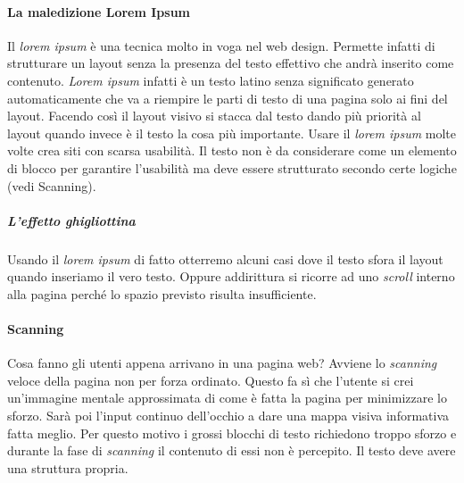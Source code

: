 			\paragraph{La maledizione Lorem Ipsum}
				Il \emph{lorem ipsum} è una tecnica molto in voga nel web design. Permette infatti di strutturare un layout senza la presenza del testo effettivo che andrà inserito come contenuto. \emph{Lorem ipsum} infatti è un testo latino senza significato generato automaticamente che va a riempire le parti di testo di una pagina solo ai fini del layout.
				Facendo così il layout visivo si stacca dal testo dando più priorità al layout quando invece è il testo la cosa più importante. Usare il \emph{lorem ipsum} molte volte crea siti con scarsa usabilità.
				Il testo non è da considerare come un elemento di blocco per garantire l'usabilità ma deve essere strutturato secondo certe logiche (vedi Scanning).
				
				\subparagraph{L'effetto ghigliottina}
					Usando il \emph{lorem ipsum} di fatto otterremo alcuni casi dove il testo sfora il layout quando inseriamo il vero testo. Oppure addirittura si ricorre ad uno \emph{scroll} interno alla pagina perché lo spazio previsto risulta insufficiente. 
				
			\paragraph{Scanning}
				Cosa fanno gli utenti appena arrivano in una pagina web? Avviene lo \emph{scanning} veloce della pagina non per forza ordinato. Questo fa sì che l'utente si crei un'immagine mentale approssimata di come è fatta la pagina per minimizzare lo sforzo. Sarà poi l'input continuo dell'occhio a dare una mappa visiva informativa fatta meglio. Per questo motivo i grossi blocchi di testo richiedono troppo sforzo e durante la fase di \emph{scanning} il contenuto di essi non è percepito. Il testo deve avere una struttura propria.
			
